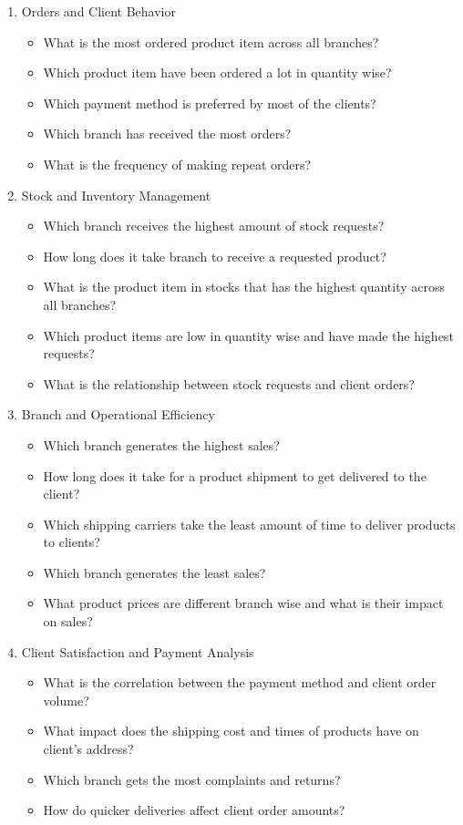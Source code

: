 \documentclass[a4Paper,12pt]{report}
\begin{document}
\begin{enumerate}
\item Orders and Client Behavior
	\begin{itemize}
	\item What is the most ordered product item across all branches?  
	\item Which product item have been ordered a lot in quantity wise?
	\item Which payment method is preferred by most of the clients? 
	\item Which branch has received the most orders? 
	\item What is the frequency of making repeat orders?  
	\end{itemize}
\item Stock and Inventory Management 
	\begin{itemize}
	\item Which branch receives the highest amount of stock requests? 
	\item How long does it take branch to receive a requested product?  
	\item What is the product item in stocks that has the highest quantity across all branches?  
	\item Which product items are low in quantity wise and have made the highest requests?  
	\item What is the relationship between stock requests and client orders?
	\end{itemize}
\item Branch and Operational Efficiency 
	\begin{itemize}
	\item Which branch generates the highest sales?  
	\item How long does it take for a product shipment to get delivered to the client?
	\item Which shipping carriers take the least amount of time to deliver products to clients?
	\item Which branch generates the least sales?
	\item What product prices are different branch wise and what is their impact on sales? 
	\end{itemize}
\item Client Satisfaction and Payment Analysis
	\begin{itemize}
	\item What is the correlation between the payment method and client order volume?
	\item What impact does the shipping cost and times of products have on client’s address?  
	\item Which branch gets the most complaints and returns?
	\item How do quicker deliveries affect client order amounts?
	\end{itemize}
\end{enumerate}
\end{document}

